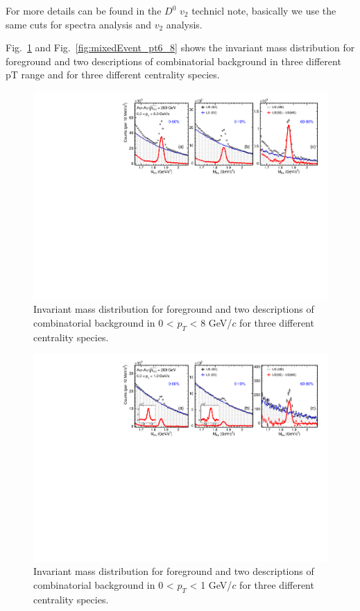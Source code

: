 For more details can be found in the $D^0$ $v_2$ technicl note, basically we use the same cuts for spectra analysis and $v_2$ analysis.

Fig.~\ref{fig:mixedEvent_pt0_8} and Fig.~\ref{fig:mixedEvent_pt6_8} shows the invariant mass distribution for foreground and two descriptions of combinatorial background in three different pT range and for three different centrality species.

\begin{figure}[htbp]
\centering
\includegraphics[keepaspectratio,width=1.0\textwidth]{figure/Run14_D0HFT/signal_0_8GeV.pdf}
\caption{Invariant mass distribution for foreground and two descriptions of combinatorial background in 0 < $p_T$ < 8 GeV/$c$ for three different centrality species.}
\label{fig:mixedEvent_pt0_8}
\end{figure}

\begin{figure}[htbp]
\centering
\includegraphics[keepaspectratio,width=1.0\textwidth]{figure/Run14_D0HFT/signal2_0_1GeV.pdf}
\caption{Invariant mass distribution for foreground and two descriptions of combinatorial background in 0 < $p_T$ < 1 GeV/$c$ for three different centrality species.}
\label{fig:mixedEvent_pt0_1}
\end{figure}

